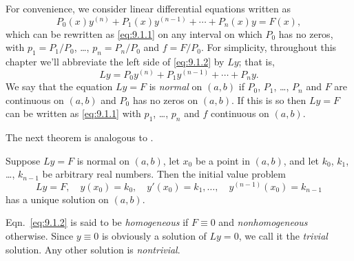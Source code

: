 For convenience, we consider linear differential equations written
as
\begin{equation}\label{eq:9.1.2}
P_0(x)y^{(n)}+P_1(x)y^{(n-1)}+\cdots+P_n(x)y=F(x),
\end{equation}
which can be rewritten as \eqref{eq:9.1.1} on any interval on
which $P_0$ has no zeros, with $p_1=P_1/P_0$, \dots, $p_n=P_n/P_0$ and
$f=F/P_0$. For simplicity, throughout this chapter we'll
abbreviate the left side of \eqref{eq:9.1.2} by $Ly$; that is,
\[
Ly=P_0y^{(n)}+P_1y^{(n-1)}+\cdots+P_ny.
\]
We say that the equation $Ly=F$ is \emph{\color{blue}normal} on $(a,b)$ if
$P_0$, $P_1$, \dots, $P_n$ and $F$ are continuous on $(a,b)$ and $P_0$ has
no zeros on $(a,b)$. If this is so then $Ly=F$ can be
written as \eqref{eq:9.1.1} with $p_1$, \dots, $p_n$ and $f$ continuous on
$(a,b)$.

The next theorem is analogous to
.

\begin{theorem}\label{thmtype:9.1.1}
Suppose   $Ly=F$ is normal on $(a,b)$, let $x_0$ be a point in
$(a,b)$,
and let $k_0$, $k_1$, \dots, $k_{n-1}$ be arbitrary real numbers. Then
the initial value problem
\[
Ly=F, \quad  y(x_0)=k_0,\quad y'(x_0)=k_1,\dots,\quad y^{(n-1)}(x_0)=k_{n-1}
\]
has a unique solution on $(a,b)$.
\end{theorem}



Eqn.~\eqref{eq:9.1.2} is said to be \emph{\color{blue}homogeneous} if $F\equiv0$ and
\emph{\color{blue}nonhomogeneous}
otherwise. Since $y\equiv0$ is obviously a
solution of $Ly=0$, we call it the \emph{\color{blue}trivial} solution. Any other
solution is \emph{\color{blue}nontrivial}.



